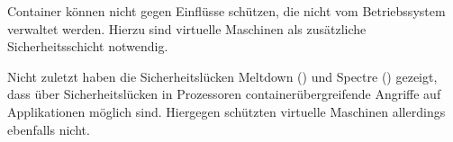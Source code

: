 Container können nicht gegen Einflüsse schützen, die nicht vom Betriebssystem verwaltet werden. Hierzu sind virtuelle Maschinen als zusätzliche Sicherheitsschicht notwendig.\cite{11517836120160501}

Nicht zuletzt haben die Sicherheitslücken Meltdown (\cite{DBLP:journals/corr/abs-1801-01207}) und Spectre (\cite{DBLP:journals/corr/abs-1801-01203}) gezeigt, dass über Sicherheitslücken in Prozessoren containerübergreifende Angriffe auf Applikationen möglich sind. Hiergegen schützten virtuelle Maschinen allerdings ebenfalls nicht.  
